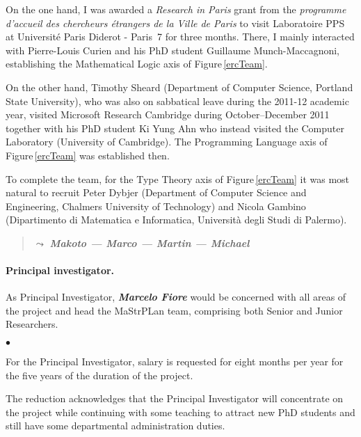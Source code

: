 \documentclass[11pt,twocolumn]{article}
\newenvironment{myitemize}
  {\begin{list}{$\bullet$}
  {\setlength{\topsep}{2pt}
   \setlength{\partopsep}{2pt}
   \setlength{\itemsep}{2.5pt}
   \setlength{\parsep}{2.5pt}
   \setlength{\leftmargin}{1em}
   \setlength{\labelwidth}{.5em}}}
  {\end{list}}
\newcommand{\erc}{{\small\sf MaStrPLan}}
\newcommand{\note}[1]%
{\begin{quote}{\color{blue}$\leadsto$ \bf\em #1}\end{quote}}
\begin{document}
On the one hand, I was awarded a \emph{Research in Paris} grant from the
\emph{programme d'accueil des chercheurs \'etrangers de la Ville de Paris}
to visit Laboratoire PPS at Universit\'e Paris Diderot - Paris~7 for three
months.  There, I mainly interacted with Pierre-Louis Curien and his PhD
student Guillaume Munch-Maccagnoni, establishing the Mathematical Logic
axis of Figure\,\ref{ercTeam}.

On the other hand, Timothy Sheard (Department of Computer Science,
Portland State University), who was also on sabbatical leave during the
2011-12 academic year, visited Microsoft Research Cambridge during
October--December 2011 together with his PhD student Ki Yung Ahn who
instead visited the Computer Laboratory (University of Cambridge).  The
Programming Language axis of Figure\,\ref{ercTeam} was established then.

To complete the team, for the Type Theory axis of Figure\,\ref{ercTeam} it
was most natural to recruit Peter Dybjer (Department of Computer Science
and Engineering, Chalmers University of Technology) and Nicola Gambino
(Dipartimento di Matematica e Informatica, Universit\`a degli Studi di
Palermo).  

\note{Makoto --- Marco --- Martin --- Michael}

\paragraph*{Principal investigator.}

As Principal Investigator, \textbf{\em Marcelo Fiore} would be concerned
with all areas of the project and head the {\erc} team, comprising both
Senior and Junior Researchers.  
\begin{myitemize}
\item
For the Principal Investigator, salary is requested for eight months per
year for the five years of the duration of the project.  
\end{myitemize}
The reduction acknowledges that the Principal Investigator will concentrate on the project while continuing with some teaching to attract new PhD students and still have some departmental administration duties.
\end{document}
